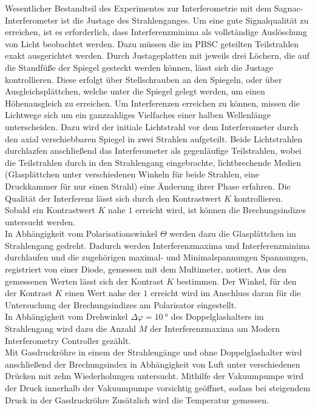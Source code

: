 \label{durchfuehrung}
\noindent Wesentlicher Bestandteil des Experimentes zur Interferometrie mit dem
Sagnac-Interferometer ist die Justage des Strahlenganges. Um eine gute
Signalqualität zu erreichen, ist es erforderlich, dass Interferenzminima als
vollständige Auslöschung von Licht beobachtet werden. Dazu müssen die im PBSC
geteilten Teilstrahlen exakt ausgerichtet werden. Durch Justageplatten mit
jeweils drei Löchern, die auf die Standfüße der Spiegel gesteckt werden können,
lässt sich die Justage kontrollieren. Diese erfolgt über Stellschrauben an den
Spiegeln, oder über Ausgleichsplättchen, welche unter die Spiegel gelegt werden,
um einen Höhenausgleich zu erreichen. Um Interferenzen erreichen zu können,
missen die Lichtwege sich um ein ganzzahliges Vielfaches einer halben Wellenlänge
unterscheiden. Dazu wird der initiale Lichtstrahl vor dem Interferometer durch
den axial verschiebbaren Spiegel in zwei Strahlen aufgeteilt. Beide Lichtstrahlen
durchlazfen anschließend das Interferometer als gegenläufige Teilstrahlen, wobei
die Teilstrahlen durch in den Strahlengang eingebrachte, lichtbrechende Medien
(Glasplättchen unter verschiedenen Winkeln für beide Strahlen, eine Druckkammer
für nur einen Strahl) eine Änderung ihrer Phase erfahren. Die Qualität der
Interferenz lässt sich durch den Kontrastwert $K$ kontrollieren. Sobald ein
Kontrastwert $K$ nahe $1$ erreicht wird, ist können die Brechungsindizes
untersucht werden. \\
\noindent In Abhängigkeit vom Polarisationswinkel $\Theta$ werden dazu die
Glasplättchen im Strahlengang gedreht. Dadurch werden Interferenzmaxima und
Interferenzminima durchlaufen und die zugehörigen maximal- und Minimalspannungen
Spannungen, registriert von einer Diode, gemessen mit dem Multimeter, notiert.
Aus den gemessenen Werten lässt sich der Kontrast $K$ bestimmen. Der Winkel, für
den der Kontrast $K$ einen Wert nahe der $1$ erreicht wird im Anschluss daran für
die Untersuchung der Brechungsindizes am Polarisator eingestellt. \\
\noindent In Abhängigkeit vom Drehwinkel $\Delta \varphi = \SI{10}{\degree}$ des
Doppelglashalters im Strahlengang wird dazu die Anzahl $M$ der Interferenzmaxima
am Modern Interferometry Controller gezählt.  \\
\noindent Mit Gasdruckröhre in einem der Strahlengänge und ohne Doppelglashalter
wird anschließend der Brechungsindex in Abhängigkeit von Luft unter verschiedenen
Drücken mit zehn Wiederholungen untersucht. Mithilfe der Vakuumpumpe wird der Druck innerhalb der
Vakuumpumpe vorsichtig geöffnet, sodass bei steigendem Druck in der Gasdruckröhre
Zusätzlich wird die Temperatur gemessen.
